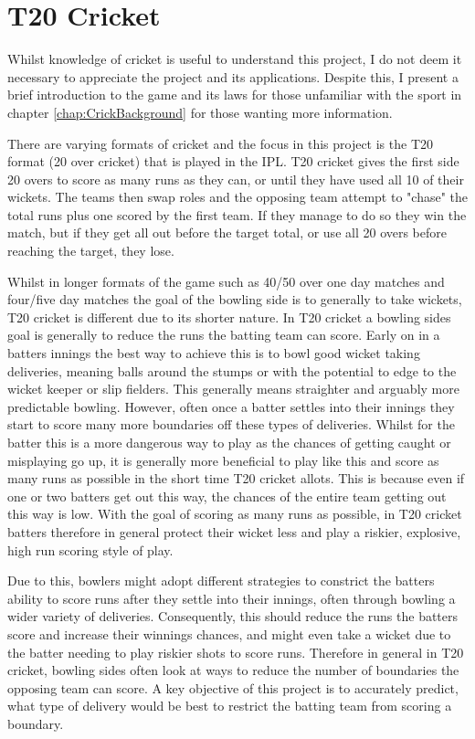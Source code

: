 \documentclass[12pt,a4paper]{report}
\theoremstyle{definition}
\begin{document}
\section{T20 Cricket} \label{sec:T20Cricket}

Whilst knowledge of cricket is useful to understand this project, I do not deem it necessary to appreciate the project and its applications.
Despite this, I present a brief introduction to the game and its laws for those unfamiliar with the sport in chapter \ref{chap:CrickBackground} for those wanting more information.

There are varying formats of cricket and the focus in this project is the T20 format (20 over cricket) that is played in the IPL.
T20 cricket gives the first side 20 overs to score as many runs as they can, or until they have used all 10 of their wickets.
The teams then swap roles and the opposing team attempt to "chase" the total runs plus one scored by the first team. 
If they manage to do so they win the match, but if they get all out before the target total, or use all 20 overs before reaching the target, they lose.

Whilst in longer formats of the game such as 40/50 over one day matches and four/five day matches the goal of the bowling side is to generally to take wickets, T20 cricket is different due to its shorter nature. 
In T20 cricket a bowling sides goal is generally to reduce the runs the batting team can score.
Early on in a batters innings the best way to achieve this is to bowl good wicket taking deliveries, meaning balls around the stumps or with the potential to edge to the wicket keeper or slip fielders.
This generally means straighter and arguably more predictable bowling.
However, often once a batter settles into their innings they start to score many more boundaries off these types of deliveries.
Whilst for the batter this is a more dangerous way to play as the chances of getting caught or misplaying go up, it is generally more beneficial to play like this and score as many runs as possible in the short time T20 cricket allots.
This is because even if one or two batters get out this way, the chances of the entire team getting out this way is low.
With the goal of scoring as many runs as possible, in T20 cricket batters therefore in general protect their wicket less and play a riskier, explosive, high run scoring style of play.

Due to this, bowlers might adopt different strategies to constrict the batters ability to score runs after they settle into their innings, often through bowling a wider variety of deliveries.
Consequently, this should reduce the runs the batters score and increase their winnings chances, and might even take a wicket due to the batter needing to play riskier shots to score runs.
Therefore in general in T20 cricket, bowling sides often look at ways to reduce the number of boundaries the opposing team can score.
A key objective of this project is to accurately predict, what type of delivery would be best to restrict the batting team from scoring a boundary.
\end{document}
